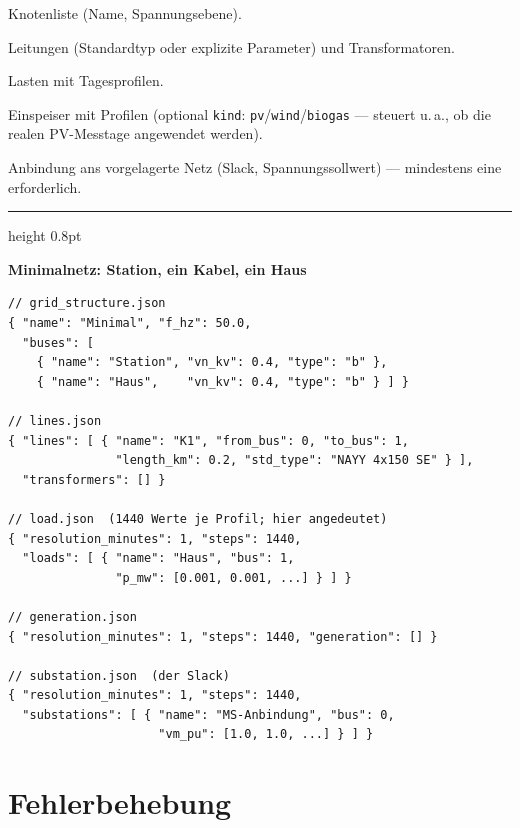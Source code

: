 \documentclass[11pt,a4paper,parskip=half]{scrreprt}
\newenvironment{beispiel}[1][Beispiel]
  {\par\medskip
   {\color{bsp}\hrule height 0.8pt}\nopagebreak\smallskip
   \noindent\textbf{\textsf{\textcolor{bsp}{#1}}}\quad\ignorespaces}
  {\par\nopagebreak\smallskip{\color{bsp}\hrule height 0.8pt}\par\medskip}
\begin{document}
\begin{description}[nosep]
  \item[\texttt{grid\_structure.json}] Knotenliste (Name, Spannungsebene).
  \item[\texttt{lines.json}] Leitungen (Standardtyp oder explizite
    Parameter) und Transformatoren.
  \item[\texttt{load.json}] Lasten mit Tagesprofilen.
  \item[\texttt{generation.json}] Einspeiser mit Profilen (optional
    \texttt{kind}: \texttt{pv}/\texttt{wind}/\texttt{biogas} ---
    steuert u.\,a., ob die realen PV-Messtage angewendet werden).
  \item[\texttt{substation.json}] Anbindung ans vorgelagerte Netz
    (Slack, Spannungssollwert) --- mindestens eine erforderlich.
\end{description}

\begin{beispiel}[Minimalnetz: Station, ein Kabel, ein Haus]
\begin{lstlisting}
// grid_structure.json
{ "name": "Minimal", "f_hz": 50.0,
  "buses": [
    { "name": "Station", "vn_kv": 0.4, "type": "b" },
    { "name": "Haus",    "vn_kv": 0.4, "type": "b" } ] }

// lines.json
{ "lines": [ { "name": "K1", "from_bus": 0, "to_bus": 1,
               "length_km": 0.2, "std_type": "NAYY 4x150 SE" } ],
  "transformers": [] }

// load.json  (1440 Werte je Profil; hier angedeutet)
{ "resolution_minutes": 1, "steps": 1440,
  "loads": [ { "name": "Haus", "bus": 1,
               "p_mw": [0.001, 0.001, ...] } ] }

// generation.json
{ "resolution_minutes": 1, "steps": 1440, "generation": [] }

// substation.json  (der Slack)
{ "resolution_minutes": 1, "steps": 1440,
  "substations": [ { "name": "MS-Anbindung", "bus": 0,
                     "vm_pu": [1.0, 1.0, ...] } ] }
\end{lstlisting}
\end{beispiel}

\chapter{Fehlerbehebung}
\end{document}
